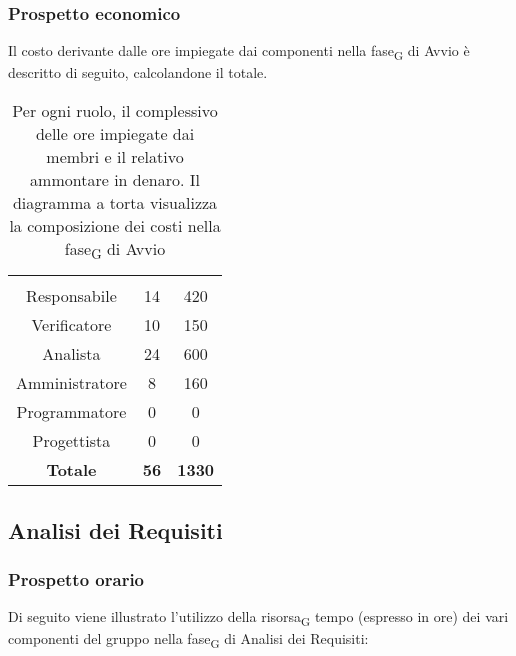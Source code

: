 \subsubsection{Prospetto economico}
Il costo derivante dalle ore impiegate dai componenti nella \gls{fase}\textsubscript{G} di Avvio è descritto di seguito, calcolandone il totale.

\begin{table}[H]
{\setlength{\parindent}{0cm}
\begin{minipage}{.43\textwidth}
	\begin{tabular}{ccc}
	\rowcolorhead
	\headertitle{Ruolo} & \headertitle{Ore} & \headertitle{Costo(\euro{})}\\
	Responsabile & 14 & 420\\
	Verificatore & 10 & 150\\
	Analista & 24 & 600\\
	Amministratore & 8 & 160\\
	Programmatore & 0 & 0\\
	Progettista & 0 & 0\\
	\hline
	\textbf{Totale} & \textbf{56} & \textbf{1330}\\
	\end{tabular}
\end{minipage}%
\begin{minipage}{.57\textwidth}
\end{minipage} }
\caption[Prospetto economico della \gls{fase}\textsubscript{G} di Avvio]{Per ogni ruolo, il complessivo delle ore impiegate dai membri e il relativo ammontare in denaro. Il diagramma a torta visualizza la composizione dei costi nella \gls{fase}\textsubscript{G} di Avvio}
\end{table}



\subsection{Analisi dei Requisiti}

\subsubsection{Prospetto orario}
Di seguito viene illustrato l'utilizzo della \gls{risorsa}\textsubscript{G} tempo (espresso in ore) dei vari componenti del gruppo nella \gls{fase}\textsubscript{G} di Analisi dei Requisiti:

